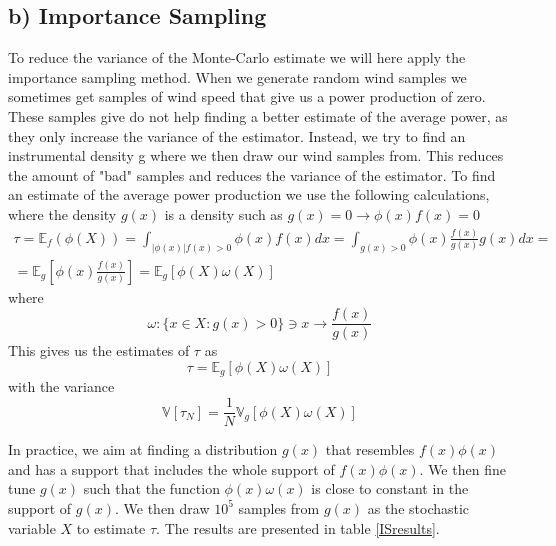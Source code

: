\documentclass[a4paper]{article}
\begin{document}
\subsection*{b) Importance Sampling}
To reduce the variance of the Monte-Carlo estimate we will here apply the importance sampling method. When we generate random wind samples we sometimes get samples of wind speed that give us a power production of zero. These samples give do not help finding a better estimate of the average power, as they only increase the variance of the estimator. Instead, we try to find an instrumental density g where we then draw our wind samples from. This reduces the amount of "bad" samples and reduces the variance of the estimator. \noindent To find an estimate of the average power production we use the following calculations, where the density $g(x)$ is a density such as $g(x) = 0 \rightarrow \phi(x)f(x) = 0$
\begin{equation}
    \begin{gathered}
        \tau = \mathbb{E}_f(\phi(X)) = \int_{|\phi(x)|f(x)>0}\phi(x)f(x)dx = \int_{g(x)>0}\phi(x)\frac{f(x)}{g(x)}g(x)dx = \\
        = \mathbb{E}_g[\phi(x)\frac{f(x)}{g(x)}] = \mathbb{E}_g[\phi(X)\omega(X)]
    \end{gathered}
\end{equation}
where
\begin{equation}
    \omega : \{x \in X : g(x)>0 \} \ni x \rightarrow \frac{f(x)}{g(x)}
\end{equation}
This gives us the estimates of $\tau$ as
\begin{equation}
    \tau = \mathbb{E}_g[\phi(X)\omega(X)]
\end{equation}
with the variance
\begin{equation}
    \mathbb{V}[\tau_N] = \frac{1}{N}\mathbb{V}_g[\phi(X)\omega(X)]
\end{equation}

In practice, we aim at finding a distribution $g(x)$ that resembles $f(x)\phi(x)$ and has a support that includes the whole support of $f(x)\phi(x)$. We then fine tune $g(x)$ such that the function $\phi(x)\omega(x)$ is close to constant in the support of $g(x)$. We then draw $10^5$ samples from $g(x)$ as the stochastic variable $X$ to estimate $\tau$. The results are presented in table \ref{ISresults}.
\end{document}
